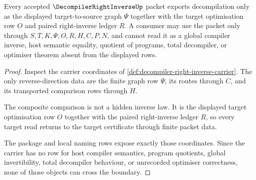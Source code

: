 \begin{theorem}
\label{thm:decompiler-right-inverse-non-escape-boundary}
Every accepted $\DecompilerRightInverseUp$ packet exports decompilation only as
the displayed target-to-source graph $\Psi$ together with the target
optimisation row $O$ and paired right-inverse ledger $R$. A consumer may use the
packet only through $S,T,K,\Psi,O,R,H,C,P,N$, and cannot read it as a global
compiler inverse, host semantic equality, quotient of programs, total
decompiler, or optimiser theorem absent from the displayed rows.
\end{theorem}
\begin{proof}
Inspect the carrier coordinates of
\autoref{def:decompiler-right-inverse-carrier}. The only reverse-direction data
are the finite graph row $\Psi$, its routes through $C$, and its transported
comparison rows through $H$.

The composite comparison is not a hidden inverse law. It is the displayed
target optimisation row $O$ together with the paired right-inverse ledger $R$,
so every target read returns to the target certificate through finite packet
data.

The package and local naming rows expose exactly those coordinates. Since the
carrier has no row for host compiler semantics, program quotients, global
invertibility, total decompiler behaviour, or unrecorded optimiser correctness,
none of those objects can cross the boundary.
\end{proof}


\begin{closurestatus}{\DecompilerRightInverseUp}
  \theoryclosure{\seedClosure}
  \formalstatus{\unformalizedV}
\end{closurestatus}

